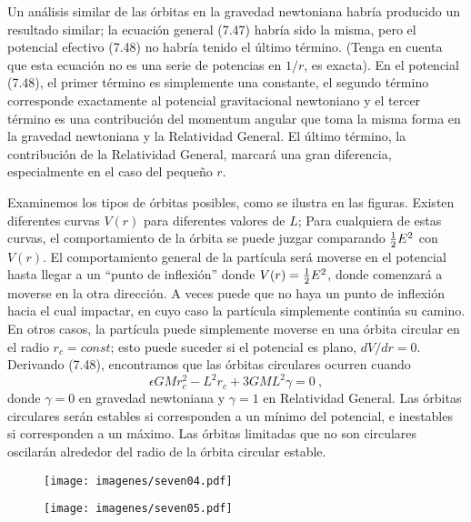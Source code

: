 \documentclass[11pt,b5paper,openany,twoside]{book}
\begin{document}
Un análisis similar de las órbitas en la gravedad newtoniana habría producido un resultado similar; la ecuación general (7.47) habría sido la misma, pero el potencial efectivo (7.48) no habría tenido el último término.
(Tenga en cuenta que esta ecuación no es una serie de potencias en $1/r$, es exacta).
En el potencial (7.48), el primer término es simplemente una constante, el segundo término corresponde exactamente al potencial gravitacional newtoniano y el tercer término es una contribución del momentum angular que toma la misma forma en la gravedad newtoniana y la Relatividad General.
El último término, la contribución de la Relatividad General, marcará una gran diferencia, especialmente en el caso del pequeño $r$.

Examinemos los tipos de órbitas posibles, como se ilustra en las figuras.
Existen diferentes curvas $V(r)$ para diferentes valores de $L$; Para cualquiera de estas curvas, el comportamiento de la órbita se puede juzgar comparando ${1\over 2}E^2$ con $V(r)$.
El comportamiento general de la partícula será moverse en el potencial hasta llegar a un ``punto de inflexión'' donde $V(r)={1\over 2}E^2$, donde comenzará a moverse en la otra dirección.
A veces puede que no haya un punto de inflexión hacia el cual impactar, en cuyo caso la partícula simplemente continúa su camino.
En otros casos, la partícula puede simplemente moverse en una órbita circular en el radio $r_c= const$; esto puede suceder si el potencial es plano, $dV/dr=0$.
Derivando (7.48), encontramos que las órbitas circulares ocurren cuando
\begin{equation}
\epsilon GM r_c^2 - L^2 r_c +3GML^2\gamma =0\ ,\label{7.49}
\end{equation}
donde $\gamma=0$ en gravedad newtoniana y $\gamma=1$ en Relatividad General.
Las órbitas circulares serán estables si corresponden a un mínimo del potencial, e inestables si corresponden a un máximo.
Las órbitas limitadas que no son circulares oscilarán alrededor del radio de la órbita circular estable.

\begin{figure}[h]
\centering
\texttt{[image: imagenes/seven04.pdf]}
\end{figure}

\begin{figure}[h]
\centering
\texttt{[image: imagenes/seven05.pdf]}
\end{figure}
\end{document}
